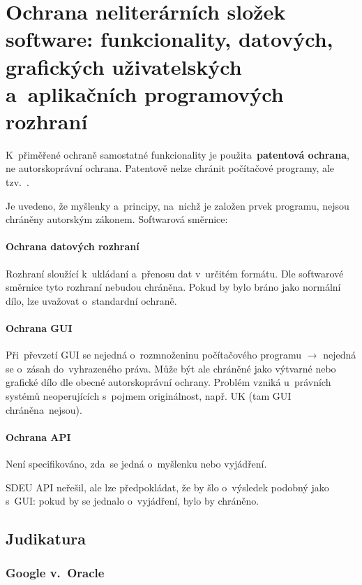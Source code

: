 \clearpage
\section{Ochrana neliterárních složek software: funkcionality, datových, grafických uživatelských a~aplikačních programových rozhraní}

K~přiměřené ochraně samostatné funkcionality je použita~\textbf{patentová ochrana}, ne autorskoprávní ochrana. Patentově nelze chránit počítačové programy, ale tzv.~.

Je uvedeno, že myšlenky a~principy, na~nichž je založen prvek programu, nejsou chráněny autorským zákonem. Softwarová směrnice: \emph{}

\paragraph{Ochrana datových rozhraní} Rozhraní sloužící k~ukládaní a~přenosu dat v~určitém formátu. Dle softwarové směrnice tyto rozhraní nebudou chráněna. Pokud by bylo bráno jako normální dílo, lze uvažovat o~standardní ochraně.

\paragraph{Ochrana GUI} Při~převzetí GUI se nejedná o~rozmnoženinu počítačového programu $\rightarrow$ nejedná se o~zásah do~vyhrazeného práva. Může být ale chráněné jako výtvarné nebo grafické dílo dle obecné autorskoprávní ochrany. Problém vzniká u~právních systémů neoperujících s~pojmem originálnost, např. UK (tam GUI chráněna~nejsou).

\paragraph{Ochrana API} Není specifikováno, zda~se jedná o~myšlenku nebo vyjádření.

SDEU API neřešil, ale lze předpokládat, že by šlo o~výsledek podobný jako s~GUI: pokud by se jednalo o~vyjádření, bylo by chráněno.

\subsection{Judikatura}

\subsubsection{Google v.~Oracle}


